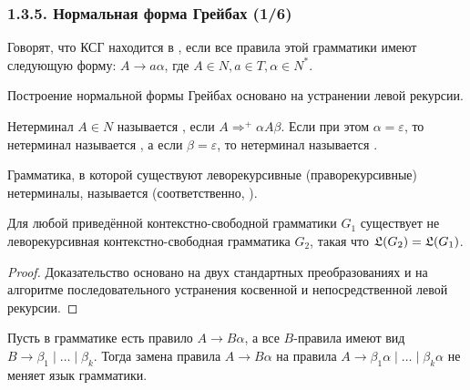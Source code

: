\begin{frame}
\frametitle{1.3.5. Нормальная форма Грейбах (1/6)}

Говорят, что КСГ находится в 
, если все правила этой грамматики
имеют следующую форму: 
$A\to a\alpha$, где $A \in N, a\in T, \alpha\in N^*$. 

Построение нормальной формы Грейбах 
основано на устранении левой рекурсии.

Нетерминал $A\in N$ называется 
,
если $A\Rightarrow^+\alpha A \beta$. 
Если при этом $\alpha =\varepsilon$, то
нетерминал называется 
,
а если $\beta =\varepsilon$, то
нетерминал называется 
.

\medskip
Грамматика, в которой существуют леворекурсивные
(праворекурсивные) нетерминалы,
называется 
 (соответственно, ).

\begin{theorem}
Для любой приведённой контекстно-свободной грамматики $G_1$
существует не леворекурсивная контекстно-свободная грамматика $G_2$,
такая что  $\frak{L}(G_2)=\frak{L}(G_1)$.
\end{theorem}
\begin{proof}
Доказательство основано на двух стандартных преобразованиях и
на алгоритме последовательного устранения косвенной и непосредственной левой рекурсии.
\end{proof}

\begin{lemma}
Пусть в грамматике есть правило $A\to B\alpha$, а все $B$-правила имеют вид
$B\to \beta_1\mid \dots \mid \beta_k$.
Тогда замена правила $A\to B\alpha$ на правила
$A\to \beta_1\alpha \mid \dots \mid \beta_k\alpha$
не меняет язык грамматики.
\end{lemma}
\end{frame}


